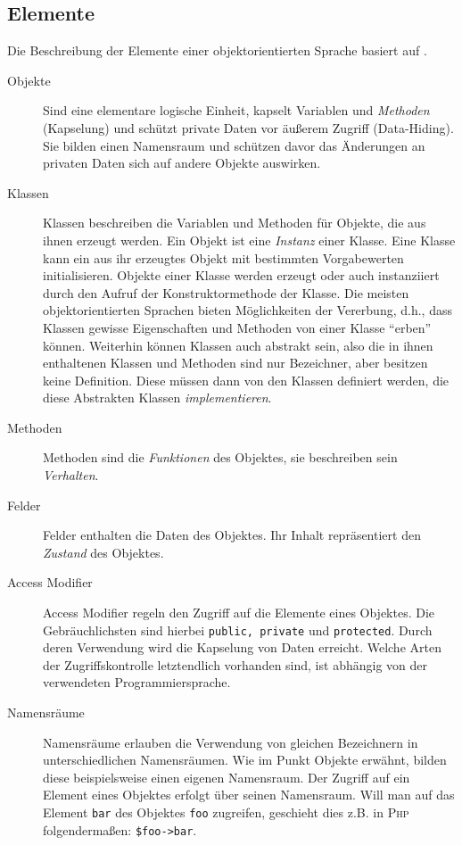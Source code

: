 \subsection{Elemente}
\label{sec:elements_of_object_oriented_languages}

Die Beschreibung der Elemente einer objektorientierten Sprache basiert auf \cite{oopSkript2012}.

\begin{description}
    \item[Objekte] 
        Sind eine elementare logische Einheit, kapselt Variablen und \emph{Methoden} (Kapselung) und schützt private Daten vor äußerem Zugriff (Data-Hiding). Sie bilden einen Namensraum und schützen davor das Änderungen an privaten Daten sich auf andere Objekte auswirken.
    \item[Klassen] 
        Klassen beschreiben die Variablen und Methoden für Objekte, die aus ihnen erzeugt werden. Ein Objekt ist eine \emph{Instanz} einer Klasse. Eine Klasse kann ein aus ihr erzeugtes Objekt mit bestimmten Vorgabewerten initialisieren. Objekte einer Klasse werden erzeugt oder auch instanziiert durch den Aufruf der Konstruktormethode der Klasse.
        Die meisten objektorientierten Sprachen bieten Möglichkeiten der Vererbung, d.h., dass Klassen gewisse Eigenschaften und Methoden von einer Klasse \enquote{erben} können. Weiterhin können Klassen auch abstrakt sein, also die in ihnen enthaltenen Klassen und Methoden sind nur Bezeichner, aber besitzen keine Definition. Diese müssen dann von den Klassen definiert werden, die diese Abstrakten Klassen \emph{implementieren}.
    \item[Methoden]
        Methoden sind die \emph{Funktionen} des Objektes, sie beschreiben sein \emph{Verhalten}.
    \item[Felder]
        Felder enthalten die Daten des Objektes. Ihr Inhalt repräsentiert den \emph{Zustand} des Objektes.
    \item[Access Modifier]    
        Access Modifier regeln den Zugriff auf die Elemente eines Objektes. Die Gebräuchlichsten sind hierbei \texttt{public, private} und \texttt{protected}. Durch deren Verwendung wird die Kapselung von Daten erreicht. Welche Arten der Zugriffskontrolle letztendlich vorhanden sind, ist abhängig von der verwendeten Programmiersprache.
    \item[Namensräume]
        Namensräume erlauben die Verwendung von gleichen Bezeichnern in unterschiedlichen Namensräumen. Wie im Punkt Objekte erwähnt, bilden diese beispielsweise einen eigenen Namensraum. Der Zugriff auf ein Element eines Objektes erfolgt über seinen Namensraum. Will man auf das Element \texttt{bar} des Objektes \texttt{foo} zugreifen, geschieht dies z.B. in \textsc{Php} folgendermaßen: \texttt{\$foo->bar}.
\end{description}

